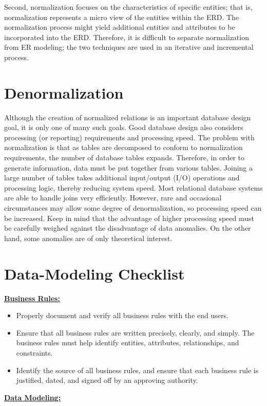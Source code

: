 \documentclass[a4paper, 12pt, titlepage]{report}
\begin{document}
{Second, normalization focuses on the characteristics of specific entities; that is, normalization represents a micro view of the entities within the ERD. The normalization process might yield additional
entities and attributes to be incorporated into the ERD. Therefore, it is difficult to separate normalization from ER modeling; the two techniques are used in an iterative and incremental process.
\section{Denormalization}
Although the creation of normalized relations is an important database design goal, it is only one of many such goals. Good database design also considers processing (or reporting) requirements and processing speed. The problem with normalization is that as tables are decomposed to conform to normalization requirements, the number of database tables expands. Therefore, in order to generate information, data must be put together from various tables. Joining a large number of tables takes additional input/output (I/O) operations and processing logic, thereby reducing system speed. Most relational database systems are able to handle joins very efficiently.
However, rare and occasional circumstances may allow some degree of denormalization, so processing speed can be increased. Keep in mind that the advantage of higher processing speed must be carefully weighed against the disadvantage of data anomalies. On the other hand, some anomalies are of only theoretical interest. 
\pagebreak
\section{Data-Modeling Checklist}
\uline{\textbf{Business Rules:}}
\begin{itemize}
\item Properly document and verify all business rules with the end users.
\item Ensure that all business rules are written precisely, clearly, and simply. The business rules must help identify entities, attributes, relationships, and constraints.
\item Identify the source of all business rules, and ensure that each business rule is justified, dated, and signed off by an approving authority.
\end{itemize}
\uline{\textbf{Data Modeling:}}

}
\end{document}
